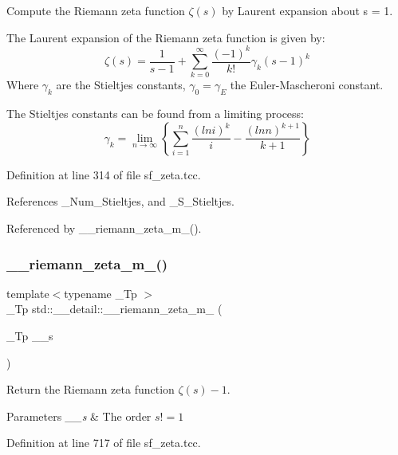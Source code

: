 Compute the Riemann zeta function $ \zeta(s) $ by Laurent expansion about s = 1. 

The Laurent expansion of the Riemann zeta function is given by\+: \[ \zeta(s) = \frac{1}{s-1} + \sum_{k=0}^{\infty} \frac{(-1)^k}{k!}\gamma_k (s-1)^k \] Where $ \gamma_k $ are the Stieltjes constants, $ \gamma_0 = \gamma_E $ the Euler-\/\+Mascheroni constant.

The Stieltjes constants can be found from a limiting process\+: \[ \gamma_k = \lim_{n \to \infty} \left\{ \sum_{i=1}^{n}\frac{(ln i)^k}{i} - \frac{(ln n)^{k+1}}{k+1} \right\} \] 

Definition at line 314 of file sf\+\_\+zeta.\+tcc.



References \+\_\+\+Num\+\_\+\+Stieltjes, and \+\_\+\+S\+\_\+\+Stieltjes.



Referenced by \+\_\+\+\_\+riemann\+\_\+zeta\+\_\+m\+\_().

\mbox{\label{namespacestd_1_1____detail_a174bfa28eeb176b90ff251b5affbecb2}} 
\subsubsection{\texorpdfstring{\+\_\+\+\_\+riemann\+\_\+zeta\+\_\+m\+\_()}{\_\_riemann\_zeta\_m\_1()}}
{\footnotesize\ttfamily template$<$typename \+\_\+\+Tp $>$ \\
\+\_\+\+Tp std\+::\+\_\+\+\_\+detail\+::\+\_\+\+\_\+riemann\+\_\+zeta\+\_\+m\+\_ (\begin{DoxyParamCaption}\item[{\+\_\+\+Tp}]{\+\_\+\+\_\+s }\end{DoxyParamCaption})}



Return the Riemann zeta function $ \zeta(s) - 1 $. 


\begin{DoxyParams}{Parameters}
{\em \+\_\+\+\_\+s} & The order $ s != 1 $ \\
\hline
\end{DoxyParams}


Definition at line 717 of file sf\+\_\+zeta.\+tcc.



